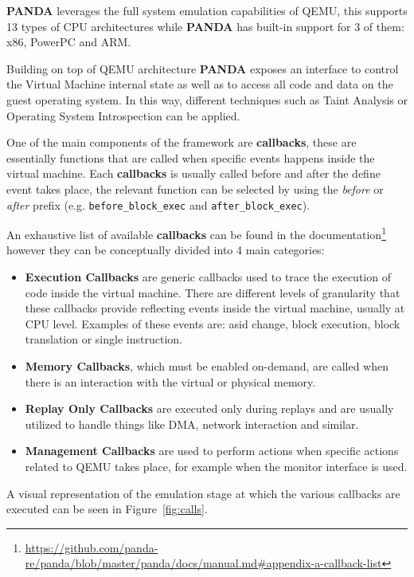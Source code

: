 \textbf{PANDA} leverages the full system emulation capabilities of QEMU, this supports 13 types of CPU architectures while \textbf{PANDA} has built-in support for 3 of them: x86, PowerPC and ARM. 

Building on top of QEMU architecture \textbf{PANDA} exposes an interface to control the Virtual Machine internal state as well as to access all code and data on the guest operating system. In this way, different techniques such as Taint Analysis or Operating System Introspection can be applied.

One of the main components of the framework are \textbf{callbacks}, these are essentially functions that are called when specific events happens inside the virtual machine. Each \textbf{callbacks} is usually called before and after the define event takes place, the relevant function can be selected by using the \textit{before} or \textit{after} prefix (e.g. \lstinline{before_block_exec} and \lstinline{after_block_exec}).

An exhaustive list of available \textbf{callbacks} can be found in the documentation\footnote{\url{https://github.com/panda-re/panda/blob/master/panda/docs/manual.md\#appendix-a-callback-list}} however they can be conceptually divided into 4 main categories:

\begin{itemize}
    \item \textbf{Execution Callbacks} are generic callbacks used to trace the execution of code inside the virtual machine. There are different levels of granularity that these callbacks provide reflecting events inside the virtual machine, usually at CPU level. Examples of these events are: asid change, block execution, block translation or single instruction.
    \item \textbf{Memory Callbacks}, which must be enabled on-demand, are called when there is an interaction with the virtual or physical memory. 
    \item \textbf{Replay Only Callbacks} are executed only during replays and are usually utilized to handle things like DMA, network interaction and similar.
    \item \textbf{Management Callbacks} are used to perform actions when specific actions related to QEMU takes place, for example when the monitor interface is used.
\end{itemize}

A visual representation of the emulation stage at which the various callbacks are executed can be seen in Figure~\ref{fig:calls}.


